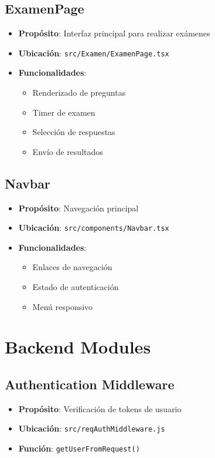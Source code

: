 \documentclass[12pt,a4paper]{report}
\begin{document}
\subsection{ExamenPage}
\begin{itemize}
    \item \textbf{Propósito}: Interfaz principal para realizar exámenes
    \item \textbf{Ubicación}: \texttt{src/Examen/ExamenPage.tsx}
    \item \textbf{Funcionalidades}:
    \begin{itemize}
        \item Renderizado de preguntas
        \item Timer de examen
        \item Selección de respuestas
        \item Envío de resultados
    \end{itemize}
\end{itemize}

\subsection{Navbar}
\begin{itemize}
    \item \textbf{Propósito}: Navegación principal
    \item \textbf{Ubicación}: \texttt{src/components/Navbar.tsx}
    \item \textbf{Funcionalidades}:
    \begin{itemize}
        \item Enlaces de navegación
        \item Estado de autenticación
        \item Menú responsivo
    \end{itemize}
\end{itemize}

\section{Backend Modules}

\subsection{Authentication Middleware}
\begin{itemize}
    \item \textbf{Propósito}: Verificación de tokens de usuario
    \item \textbf{Ubicación}: \texttt{src/reqAuthMiddleware.js}
    \item \textbf{Función}: \texttt{getUserFromRequest()}
\end{itemize}
\end{document}
